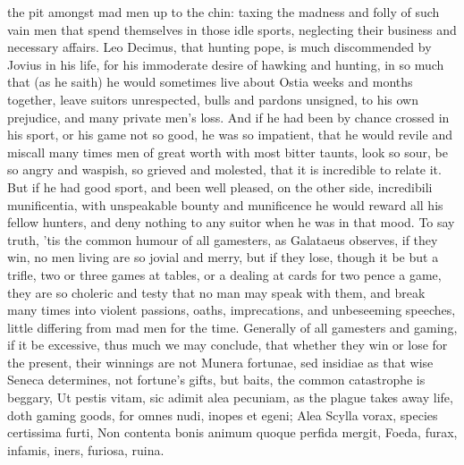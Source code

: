 {the pit amongst mad men up to the chin: taxing the madness and folly of
such vain men that spend themselves in those idle sports, neglecting
their business and necessary affairs. Leo Decimus, that hunting pope,
is much discommended by Jovius in his life, for his immoderate
desire of hawking and hunting, in so much that (as he saith) he would
sometimes live about Ostia weeks and months together, leave suitors
unrespected, bulls and pardons unsigned, to his own prejudice,
and many private men's loss. And if he had been by chance crossed
in his sport, or his game not so good, he was so impatient, that he
would revile and miscall many times men of great worth with most bitter
taunts, look so sour, be so angry and waspish, so grieved and molested,
that it is incredible to relate it. But if he had good sport, and been
well pleased, on the other side, incredibili munificentia, with
unspeakable bounty and munificence he would reward all his fellow
hunters, and deny nothing to any suitor when he was in that mood. To
say truth, 'tis the common humour of all gamesters, as Galataeus
observes, if they win, no men living are so jovial and merry, but
if they lose, though it be but a trifle, two or three games at
tables, or a dealing at cards for two pence a game, they are so
choleric and testy that no man may speak with them, and break many
times into violent passions, oaths, imprecations, and unbeseeming
speeches, little differing from mad men for the time. Generally of all
gamesters and gaming, if it be excessive, thus much we may conclude,
that whether they win or lose for the present, their winnings are not
Munera fortunae, sed insidiae as that wise Seneca determines, not
fortune's gifts, but baits, the common catastrophe is beggary,
Ut pestis vitam, sic adimit alea pecuniam, as the plague takes
away life, doth gaming goods, for  omnes nudi, inopes et egeni;
Alea Scylla vorax, species certissima furti,
Non contenta bonis animum quoque perfida mergit,
Foeda, furax, infamis, iners, furiosa, ruina.

}
